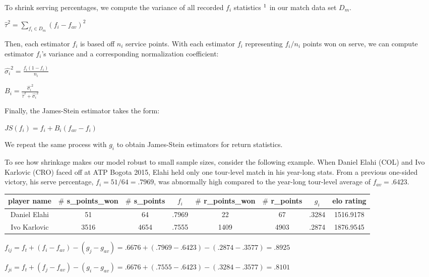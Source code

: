 \documentclass[chapterprefix=false]{report}
\begin{document}
To shrink serving percentages, we compute the variance of all recorded $f_i$ statistics $\footnote{each ${f_i}$ is computed from the previous twelve months of player data}$ in our match data set $D_m$.

$\hat{\tau}^2 = \sum_{f_i \in D_m} (f_i-f_{av})^2$

Then, each estimator $f_i$ is based off $n_i$ service points. With each estimator $f_i$ representing $f_i/n_i$ points won on serve, we can compute estimator $f_i$'s variance and a corresponding normalization coefficient:

\begin{center}
\large{$\hat{\sigma_i}^2 = \frac{f_i(1-f_i)}{n_i}$}

\large{$B_i = \frac{\hat{\sigma_i}^2}{\hat{\tau}^2+\hat{\sigma_i}^2}$}
\end{center}

Finally, the James-Stein estimator takes the form: 

\begin{center}
$JS(f_i) = f_i + B_i(f_{av}-f_i)$
\end{center}

We repeat the same process with $g_i$ to obtain James-Stein estimators for return statistics.

To see how shrinkage makes our model robust to small sample sizes, consider the following example. When Daniel Elahi (COL) and Ivo Karlovic (CRO) faced off at ATP Bogota 2015, Elahi held only one tour-level match in his year-long stats. From a previous one-sided victory, his serve percentage, $f_i=51/64=.7969$, was abnormally high compared to the year-long tour-level average of $f_{av}=.6423$. 


\begin{center}
\begin{tabular}{ |c|c|c|c|c|c|c|c| } 
 \hline
 player name & $\#$ s\_points\_won & $\#$ s\_points
 & $f_i$ &$\#$ r\_points\_won & $\#$ r\_points & $g_i$ & elo rating \\ 
 \hline
 Daniel Elahi & 51 & 64 & .7969 & 22 & 67 & .3284 & 1516.9178 
 \\
 \hline
 Ivo Karlovic & 3516 & 4654 & .7555 & 1409 & 4903 & .2874 & 1876.9545 \\ 
 \hline
\end{tabular}
\end{center}

\begin{center}
$f_{ij} = f_t + (f_i-f_{av})-(g_j-g_{av}) = .6676 + (.7969-.6423) - (.2874-.3577) = .8925$

$f_{ji} = f_t + (f_j-f_{av})-(g_i-g_{av}) = .6676 + (.7555-.6423) - (.3284-.3577) = .8101$
\end{center}
\end{document}

